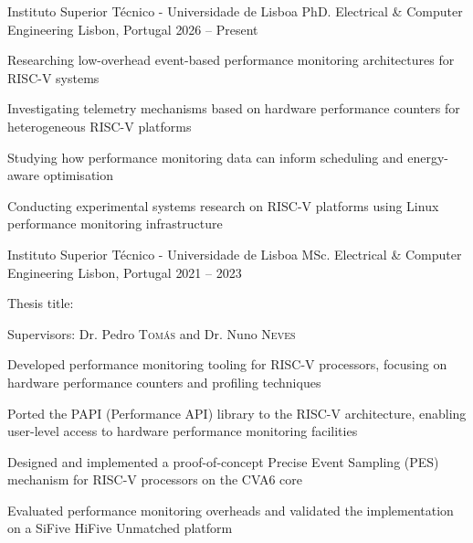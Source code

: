 
\begin{cventries}

  \cventry
    {Instituto Superior Técnico - Universidade de Lisboa}
    {PhD. Electrical \& Computer Engineering}
    {Lisbon, Portugal}
    {2026 -- Present}
    {
      \begin{cvitems}
        \item Researching low-overhead event-based performance monitoring architectures for RISC-V systems
        \item Investigating telemetry mechanisms based on hardware performance counters for heterogeneous RISC-V platforms
        \item Studying how performance monitoring data can inform scheduling and energy-aware optimisation
        \item Conducting experimental systems research on RISC-V platforms using Linux performance monitoring infrastructure
      \end{cvitems}
    }

  \cventry
    {Instituto Superior Técnico - Universidade de Lisboa}
    {MSc. Electrical \& Computer Engineering}
    {Lisbon, Portugal}
    {2021 -- 2023}
    {
      \begin{cvitems}
        \item{Thesis title: }
        \item{Supervisors: Dr. Pedro \textsc{Tomás} and Dr. Nuno \textsc{Neves}}
        \item Developed performance monitoring tooling for RISC-V processors, focusing on hardware performance counters and profiling techniques
        \item Ported the PAPI (Performance API) library to the RISC-V architecture, enabling user-level access to hardware performance monitoring facilities
        \item Designed and implemented a proof-of-concept Precise Event Sampling (PES) mechanism for RISC-V processors on the CVA6 core
        \item Evaluated performance monitoring overheads and validated the implementation on a SiFive HiFive Unmatched platform
      \end{cvitems}
      \vspace{1em}
    }


\end{cventries}
